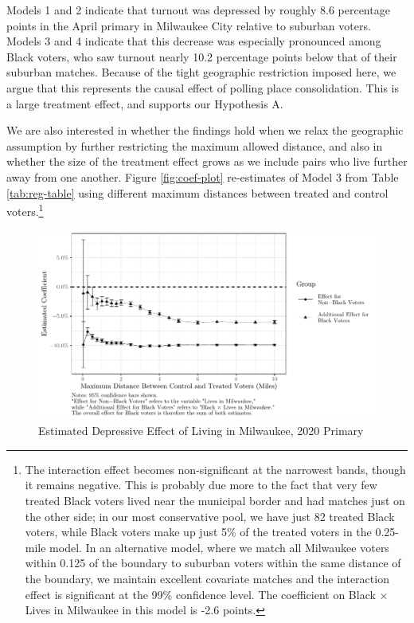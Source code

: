 \documentclass[
  12pt,
]{article}
\begin{document}
\begin{singlespace}


\end{singlespace}

Models 1 and 2 indicate that turnout was depressed by roughly 8.6 percentage points in the April primary in Milwaukee City relative to suburban voters. Models 3 and 4 indicate that this decrease was especially pronounced among Black voters, who saw turnout nearly 10.2 percentage points below that of their suburban matches. Because of the tight geographic restriction imposed here, we argue that this represents the causal effect of polling place consolidation. This is a large treatment effect, and supports our Hypothesis A.

We are also interested in whether the findings hold when we relax the geographic assumption by further restricting the maximum allowed distance, and also in whether the size of the treatment effect grows as we include pairs who live further away from one another. Figure \ref{fig:coef-plot} re-estimates of Model 3 from Table \ref{tab:reg-table} using different maximum distances between treated and control voters.\footnote{The interaction effect becomes non-significant at the narrowest bands, though it remains negative. This is probably due more to the fact that very few treated Black voters lived near the municipal border and had matches just on the other side; in our most conservative pool, we have just 82 treated Black voters, while Black voters make up just 5\% of the treated voters in the 0.25-mile model. In an alternative model, where we match all Milwaukee voters within 0.125 of the boundary to suburban voters within the same distance of the boundary, we maintain excellent covariate matches and the interaction effect is significant at the 99\% confidence level. The coefficient on Black × Lives in Milwaukee in this model is -2.6 points.}

\begin{figure}[H]

{\centering \includegraphics{mke_turnout_files/figure-latex/plot-1} 

}

\caption{\label{fig:coef-plot}Estimated Depressive Effect of Living in Milwaukee, 2020 Primary}\label{fig:plot}
\end{figure}
\end{document}
